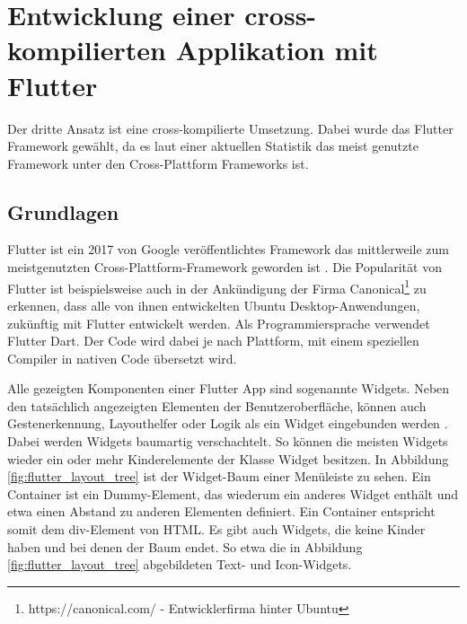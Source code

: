 \section{Entwicklung einer cross-kompilierten Applikation mit Flutter}
Der dritte Ansatz ist eine cross-kompilierte Umsetzung. Dabei wurde das Flutter Framework gewählt, da es laut einer aktuellen Statistik \cite{statist_CP_Framework} das meist genutzte Framework unter den Cross-Plattform Frameworks ist.

\subsection{Grundlagen}
\label{cha:4_3_1}
Flutter ist ein 2017 von Google veröffentlichtes Framework das mittlerweile zum meistgenutzten Cross-Plattform-Framework geworden ist \cite{statist_CP_Framework}. Die Popularität von Flutter ist beispielsweise auch in der Ankündigung der Firma Canonical\footnote{https://canonical.com/ - Entwicklerfirma hinter Ubuntu} zu erkennen, dass alle von ihnen entwickelten Ubuntu Desktop-Anwendungen, zukünftig mit Flutter entwickelt werden\cite{Ubuntu_Flutter}. Als Programmiersprache verwendet Flutter Dart. Der Code wird dabei je nach Plattform, mit einem speziellen Compiler in nativen Code übersetzt wird\cite{flutter_compilation}.

Alle gezeigten Komponenten einer Flutter App sind sogenannte Widgets. Neben den tatsächlich angezeigten Elementen der Benutzeroberfläche, können auch Gestenerkennung, Layouthelfer oder Logik als ein Widget eingebunden werden \cite{Thiele_2018}. Dabei werden Widgets baumartig verschachtelt. So können die meisten Widgets wieder ein oder mehr Kinderelemente der Klasse Widget besitzen. In Abbildung \ref{fig:flutter_layout_tree} ist der Widget-Baum einer Menüleiste zu sehen. Ein Container ist ein Dummy-Element, das wiederum ein anderes Widget enthält und etwa einen Abstand zu anderen Elementen definiert. Ein Container entspricht somit dem div-Element von HTML. Es gibt auch Widgets, die keine Kinder haben und bei denen der Baum endet. So etwa die in Abbildung \ref{fig:flutter_layout_tree} abgebildeten Text- und Icon-Widgets.


